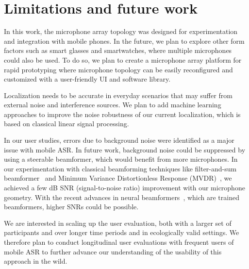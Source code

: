 \section{Limitations and future work}
In this work, the microphone array topology was designed for experimentation and integration with mobile phones. In the future, we plan to explore other form factors such as smart glasses and smartwatches, where multiple microphones could also be used. To do so, we plan to create a microphone array platform for rapid prototyping where microphone topology can be easily reconfigured and customized with a user-friendly UI and software library.

Localization needs to be accurate in everyday scenarios that may suffer from external noise and interference sources. We plan to add machine learning approaches to improve the noise robustness of our current localization, which is based on classical linear signal processing. 

In our user studies, errors due to background noise were identified as a major issue with mobile ASR. In future work, background noise could be suppressed by using a steerable beamformer, which would benefit from more microphones. In our experimentation with classical beamforming techniques like filter-and-sum beamformer~\cite{benesty2008conventional} and Minimum Variance Distortionless Response (MVDR)~\cite{xiao2017mvdr}, we achieved a few dB SNR (signal-to-noise ratio) improvement with our microphone geometry. With the recent advances in neural beamformers~\cite{li2016neural, yang2024binaural}, which are trained beamformers, higher SNRs could be possible. 

We are interested in scaling up the user evaluation, both with a larger set of participants and over longer time periods and in ecologically valid settings.
We therefore plan to conduct longitudinal user evaluations with frequent users of mobile ASR to further advance our understanding of the usability of this approach in the wild. 



